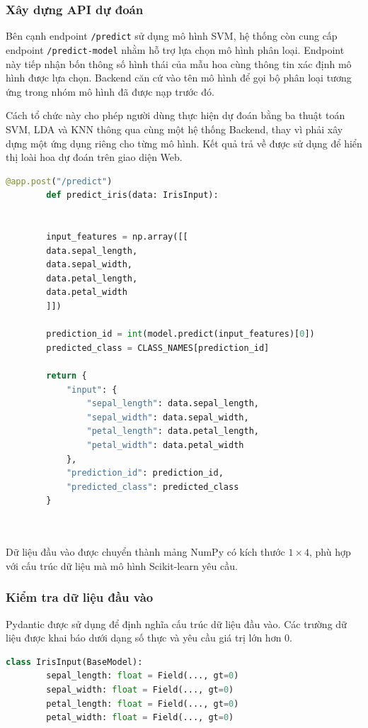 \documentclass[14pt]{extarticle}
\begin{document}
	\subsubsection{Xây dựng API dự đoán}
	
\noindent Bên cạnh endpoint \texttt{/predict} sử dụng mô hình SVM, hệ thống còn cung cấp endpoint \texttt{/predict-model} nhằm hỗ trợ lựa chọn mô hình phân loại. Endpoint này tiếp nhận bốn thông số hình thái của mẫu hoa cùng thông tin xác định mô hình được lựa chọn. Backend căn cứ vào tên mô hình để gọi bộ phân loại tương ứng trong nhóm mô hình đã được nạp trước đó.

\noindent Cách tổ chức này cho phép người dùng thực hiện dự đoán bằng ba thuật toán SVM, LDA và KNN thông qua cùng một hệ thống Backend, thay vì phải xây dựng một ứng dụng riêng cho từng mô hình. Kết quả trả về được sử dụng để hiển thị loài hoa dự đoán trên giao diện Web.
	\newpage
	\begin{lstlisting}[language=Python, numbers=none]
		@app.post("/predict")
		def predict_iris(data: IrisInput):
		
		
		input_features = np.array([[
		data.sepal_length,
		data.sepal_width,
		data.petal_length,
		data.petal_width
		]])
		
		prediction_id = int(model.predict(input_features)[0])
		predicted_class = CLASS_NAMES[prediction_id]
		
		return {
			"input": {
				"sepal_length": data.sepal_length,
				"sepal_width": data.sepal_width,
				"petal_length": data.petal_length,
				"petal_width": data.petal_width
			},
			"prediction_id": prediction_id,
			"predicted_class": predicted_class
		}
		
		
	\end{lstlisting}
	
	\noindent Dữ liệu đầu vào được chuyển thành mảng NumPy có kích thước $1\times4$, phù hợp với cấu trúc dữ liệu mà mô hình Scikit-learn yêu cầu.
	
	\subsubsection{Kiểm tra dữ liệu đầu vào}
	
	\noindent Pydantic được sử dụng để định nghĩa cấu trúc dữ liệu đầu vào. Các trường dữ liệu được khai báo dưới dạng số thực và yêu cầu giá trị lớn hơn 0.
	
	\begin{lstlisting}[language=Python, numbers=none]
		class IrisInput(BaseModel):
		sepal_length: float = Field(..., gt=0)
		sepal_width: float = Field(..., gt=0)
		petal_length: float = Field(..., gt=0)
		petal_width: float = Field(..., gt=0)
	\end{lstlisting}
	
\end{document}
